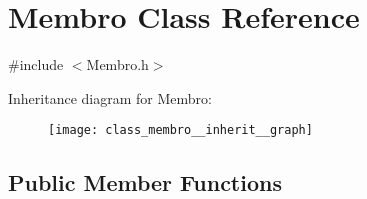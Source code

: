 \hypertarget{class_membro}{\section{Membro Class Reference}
\label{class_membro}
}


{\ttfamily \#include $<$Membro.\+h$>$}



Inheritance diagram for Membro\+:\nopagebreak
\begin{figure}[H]
\begin{center}
\leavevmode
\texttt{[image: class\_membro\_\_inherit\_\_graph]}
\end{center}
\end{figure}
\subsection*{Public Member Functions}
